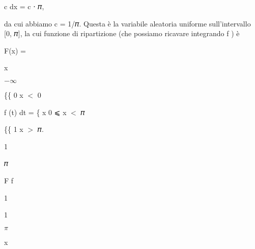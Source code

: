 \documentclass[a4paper,portrait,12pt]{article}
\begin{document}
\begin{flushleft}
c dx = c ⋅ 𝜋,
\end{flushleft}





\begin{flushleft}
da cui abbiamo c = 1/𝜋. Questa \`{e} la variabile aleatoria uniforme sull'intervallo [0, 𝜋], la cui funzione di ripartizione (che possiamo ricavare integrando f ) \`{e}
\end{flushleft}


\begin{flushleft}
F(x) =
\end{flushleft}





\begin{flushleft}
x
\end{flushleft}


$-$$\infty$





\begin{flushleft}
\{\{ 0 x $<$ 0
\end{flushleft}


\begin{flushleft}
f (t) dt = \{ x 0 ⩽ x $<$ 𝜋
\end{flushleft}


\begin{flushleft}
\{\{ 1 x $>$ 𝜋.
\end{flushleft}


1


\begin{flushleft}
𝜋
\end{flushleft}





\begin{flushleft}
F f
\end{flushleft}


1


1


\begin{flushleft}
$\pi$
\end{flushleft}





\begin{flushleft}
x
\end{flushleft}
\end{document}
